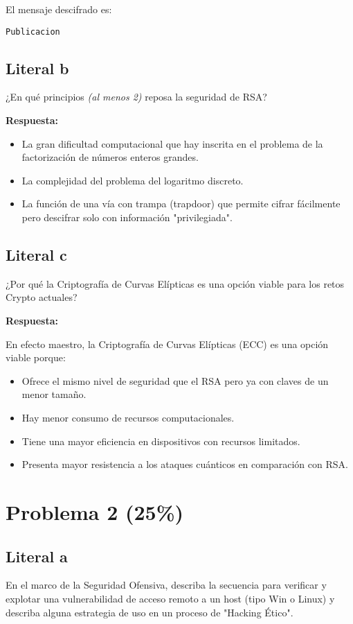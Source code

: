{El mensaje descifrado es:

\begin{verbatim}
Publicacion
\end{verbatim}





\pagebreak
\subsection{Literal b}
¿En qué principios \textit{(al menos 2)} reposa la seguridad de RSA?

\textbf{Respuesta:}
\begin{itemize}
    \item La gran dificultad computacional que hay inscrita en el problema de la factorización de números enteros grandes.
    \item La complejidad del problema del logaritmo discreto.
    \item La función de una vía con trampa (trapdoor) que permite cifrar fácilmente pero descifrar solo con información "privilegiada".
\end{itemize}

\subsection{Literal c}
¿Por qué la Criptografía de Curvas Elípticas es una opción viable para los retos Crypto actuales?

\textbf{Respuesta:}

En efecto maestro, la Criptografía de Curvas Elípticas (ECC) es una opción viable porque:
\begin{itemize}
    \item Ofrece el mismo nivel de seguridad que el RSA pero ya con claves de un menor tamaño.
    \item Hay menor consumo de recursos computacionales.
    \item Tiene una mayor eficiencia en dispositivos con recursos limitados.
    \item Presenta mayor resistencia a los ataques cuánticos en comparación con RSA.
\end{itemize}

\section{Problema 2 (25\%)}

\subsection{Literal a}
En el marco de la Seguridad Ofensiva, describa la secuencia para verificar y explotar una vulnerabilidad de acceso remoto a un host (tipo Win o Linux) y describa alguna estrategia de uso en un proceso de "Hacking Ético".


}
